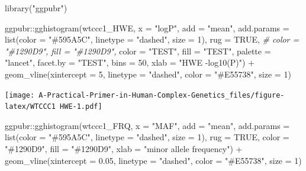 \documentclass[
]{book}
\newenvironment{Shaded}{\begin{snugshade}}{\end{snugshade}}
\newcommand{\AttributeTok}[1]{\textcolor[rgb]{0.77,0.63,0.00}{#1}}
\newcommand{\CommentTok}[1]{\textcolor[rgb]{0.56,0.35,0.01}{\textit{#1}}}
\newcommand{\ConstantTok}[1]{\textcolor[rgb]{0.00,0.00,0.00}{#1}}
\newcommand{\DecValTok}[1]{\textcolor[rgb]{0.00,0.00,0.81}{#1}}
\newcommand{\FloatTok}[1]{\textcolor[rgb]{0.00,0.00,0.81}{#1}}
\newcommand{\FunctionTok}[1]{\textcolor[rgb]{0.00,0.00,0.00}{#1}}
\newcommand{\NormalTok}[1]{#1}
\newcommand{\SpecialCharTok}[1]{\textcolor[rgb]{0.00,0.00,0.00}{#1}}
\newcommand{\StringTok}[1]{\textcolor[rgb]{0.31,0.60,0.02}{#1}}
\begin{document}
\begin{Shaded}
\begin{Highlighting}[]
\FunctionTok{library}\NormalTok{(}\StringTok{"ggpubr"}\NormalTok{)}

\NormalTok{ggpubr}\SpecialCharTok{::}\FunctionTok{gghistogram}\NormalTok{(wtccc1\_HWE, }\AttributeTok{x =} \StringTok{"logP"}\NormalTok{,}
                    \AttributeTok{add =} \StringTok{"mean"}\NormalTok{,}
                    \AttributeTok{add.params =} \FunctionTok{list}\NormalTok{(}\AttributeTok{color =} \StringTok{"\#595A5C"}\NormalTok{, }\AttributeTok{linetype =} \StringTok{"dashed"}\NormalTok{, }\AttributeTok{size =} \DecValTok{1}\NormalTok{),}
                    \AttributeTok{rug =} \ConstantTok{TRUE}\NormalTok{,}
                    \CommentTok{\# color = "\#1290D9", fill = "\#1290D9",}
                    \AttributeTok{color =} \StringTok{"TEST"}\NormalTok{, }\AttributeTok{fill =} \StringTok{"TEST"}\NormalTok{,}
                    \AttributeTok{palette =} \StringTok{"lancet"}\NormalTok{,}
                    \AttributeTok{facet.by =} \StringTok{"TEST"}\NormalTok{,}
                    \AttributeTok{bins =} \DecValTok{50}\NormalTok{,}
                    \AttributeTok{xlab =} \StringTok{"HWE {-}log10(P)"}\NormalTok{) }\SpecialCharTok{+}
  \FunctionTok{geom\_vline}\NormalTok{(}\AttributeTok{xintercept =} \DecValTok{5}\NormalTok{, }\AttributeTok{linetype =} \StringTok{"dashed"}\NormalTok{,}
                \AttributeTok{color =} \StringTok{"\#E55738"}\NormalTok{, }\AttributeTok{size =} \DecValTok{1}\NormalTok{)}
\end{Highlighting}
\end{Shaded}

\texttt{[image: A-Practical-Primer-in-Human-Complex-Genetics\_files/figure-latex/WTCCC1 HWE-1.pdf]}

\begin{Shaded}
\begin{Highlighting}[]
\NormalTok{ggpubr}\SpecialCharTok{::}\FunctionTok{gghistogram}\NormalTok{(wtccc1\_FRQ, }\AttributeTok{x =} \StringTok{"MAF"}\NormalTok{,}
                    \AttributeTok{add =} \StringTok{"mean"}\NormalTok{, }\AttributeTok{add.params =} \FunctionTok{list}\NormalTok{(}\AttributeTok{color =} \StringTok{"\#595A5C"}\NormalTok{, }\AttributeTok{linetype =} \StringTok{"dashed"}\NormalTok{, }\AttributeTok{size =} \DecValTok{1}\NormalTok{),}
                    \AttributeTok{rug =} \ConstantTok{TRUE}\NormalTok{,}
                    \AttributeTok{color =} \StringTok{"\#1290D9"}\NormalTok{, }\AttributeTok{fill =} \StringTok{"\#1290D9"}\NormalTok{,}
                    \AttributeTok{xlab =} \StringTok{"minor allele frequency"}\NormalTok{) }\SpecialCharTok{+}
  \FunctionTok{geom\_vline}\NormalTok{(}\AttributeTok{xintercept =} \FloatTok{0.05}\NormalTok{, }\AttributeTok{linetype =} \StringTok{"dashed"}\NormalTok{,}
                \AttributeTok{color =} \StringTok{"\#E55738"}\NormalTok{, }\AttributeTok{size =} \DecValTok{1}\NormalTok{)}
\end{Highlighting}
\end{Shaded}
\end{document}

